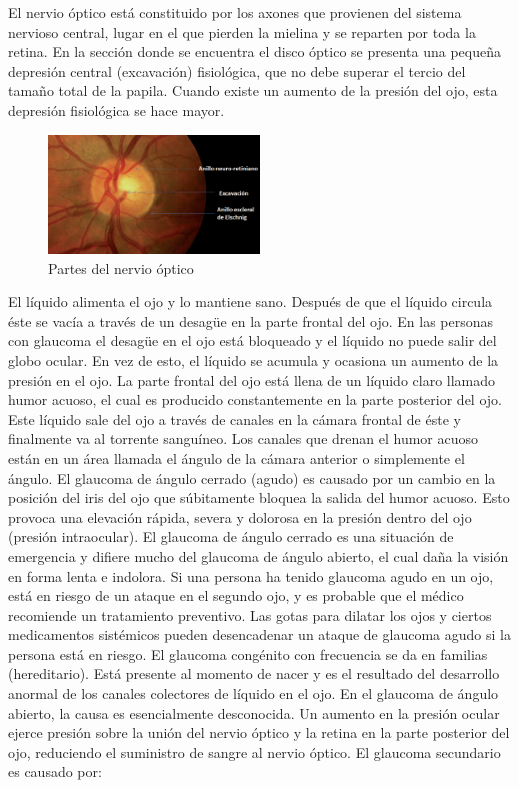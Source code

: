 \begin{itemize}
El nervio \'optico est\'a constituido por los axones que provienen del sistema nervioso central, lugar en el que pierden la mielina y se reparten por toda la retina. En la secci\'on donde se encuentra el disco  \'optico se presenta una pequeña depresi\'on central (excavaci\'on) fisiol\'ogica, que no debe superar el tercio del tamaño total de la papila.  Cuando existe un aumento de la presi\'on del ojo, esta depresi\'on fisiol\'ogica se hace mayor.
\begin{figure}[H]
	{
	\centering
	\includegraphics[width=0.5\textwidth]{Figures/nervioOptico}
	\caption[Glaucoma]{Partes del nervio \'optico}
	\label{fig:Glaucoma}
	}
\end{figure}
El l\'iquido alimenta el ojo y lo mantiene sano. Despu\'es de que el l\'iquido circula \'este se vac\'ia a trav\'es de un desagüe en la parte frontal del ojo. En las personas con glaucoma el desagüe en el ojo est\'a bloqueado y el l\'iquido no puede salir del globo ocular. En vez de esto, el l\'iquido se acumula y ocasiona un aumento de la presi\'on en el ojo. 
La parte frontal del ojo est\'a llena de un l\'iquido claro llamado humor acuoso, el cual es producido constantemente en la parte posterior del ojo. Este l\'iquido sale del ojo a trav\'es de canales en la c\'amara frontal de \'este y finalmente va al torrente sangu\'ineo. Los canales que drenan el humor acuoso est\'an en un \'area llamada el \'angulo de la c\'amara anterior o simplemente el \'angulo. El glaucoma de \'angulo cerrado (agudo) es causado por un cambio en la posici\'on del iris del ojo que s\'ubitamente bloquea la salida del humor acuoso. Esto provoca una elevaci\'on r\'apida, severa y dolorosa en la presi\'on dentro del ojo (presi\'on intraocular). El glaucoma de \'angulo cerrado es una situaci\'on de emergencia y difiere mucho del glaucoma de \'angulo abierto, el cual daña la visi\'on en forma lenta e indolora. Si una persona ha tenido glaucoma agudo en un ojo, est\'a en riesgo de un ataque en el segundo ojo, y es probable que el m\'edico recomiende un tratamiento preventivo. Las gotas para dilatar los ojos y ciertos medicamentos sist\'emicos pueden desencadenar un ataque de glaucoma agudo si la persona est\'a en riesgo. El glaucoma cong\'enito con frecuencia se da en familias (hereditario). Est\'a presente al momento de nacer y es el resultado del desarrollo anormal de los canales colectores de l\'iquido en el ojo. En el glaucoma de \'angulo abierto, la causa es esencialmente desconocida. Un aumento en la presi\'on ocular ejerce presi\'on sobre la uni\'on del nervio \'optico y la retina en la parte posterior del ojo, reduciendo el suministro de sangre al nervio \'optico. El glaucoma secundario es causado por: 

\end{itemize}
